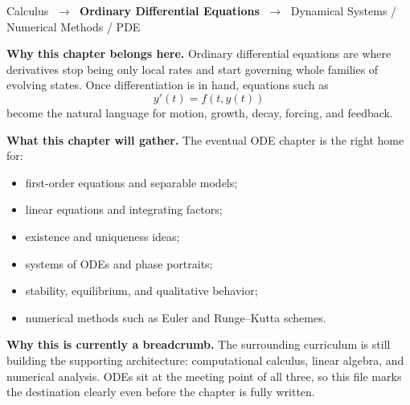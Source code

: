 
\begin{tcolorbox}[
  colback=gray!6,
  colframe=gray!40,
  arc=2pt,
  left=8pt, right=8pt, top=6pt, bottom=6pt,
  title={\small\textbf{Where This Chapter Lives}},
  fonttitle=\small\bfseries
]
\begin{center}
\small
Calculus
$\;\to\;$ \textbf{Ordinary Differential Equations}
$\;\to\;$ Dynamical Systems / Numerical Methods / PDE
\end{center}

\medskip
\noindent\textbf{Why this chapter belongs here.}
Ordinary differential equations are where derivatives stop being only local
rates and start governing whole families of evolving states.  Once
differentiation is in hand, equations such as
\[
y'(t)=f(t,y(t))
\]
become the natural language for motion, growth, decay, forcing, and
feedback.

\medskip
\noindent\textbf{What this chapter will gather.}
The eventual ODE chapter is the right home for:
\begin{itemize}
  \item first-order equations and separable models;
  \item linear equations and integrating factors;
  \item existence and uniqueness ideas;
  \item systems of ODEs and phase portraits;
  \item stability, equilibrium, and qualitative behavior;
  \item numerical methods such as Euler and Runge--Kutta schemes.
\end{itemize}

\medskip
\noindent\textbf{Why this is currently a breadcrumb.}
The surrounding curriculum is still building the supporting architecture:
computational calculus, linear algebra, and numerical analysis.  ODEs sit at
the meeting point of all three, so this file marks the destination clearly
even before the chapter is fully written.
\end{tcolorbox}

